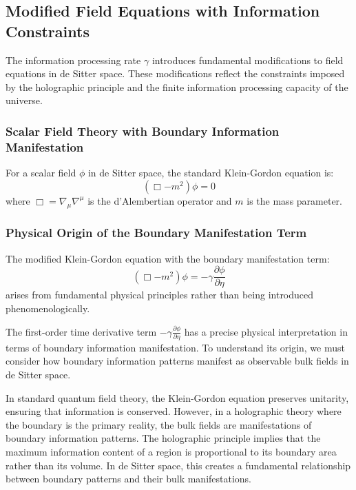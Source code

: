 \documentclass[11pt,english,twoside]{article}
\theoremstyle{plain}
\theoremstyle{definition}
\theoremstyle{remark}
\newcommand{\gammaR}{\gamma}
\begin{document}
\subsection{Modified Field Equations with Information Constraints}
\label{subsec:modified_equations}

The information processing rate $\gammaR$ introduces fundamental modifications to field equations in de Sitter space. These modifications reflect the constraints imposed by the holographic principle and the finite information processing capacity of the universe.

\subsubsection{Scalar Field Theory with Boundary Information Manifestation}

For a scalar field $\phi$ in de Sitter space, the standard Klein-Gordon equation is:
\begin{equation}
\label{eq:klein_gordon_standard}
(\Box - m^2)\phi = 0
\end{equation}
where $\Box = \nabla_{\mu} \nabla^\mu$ is the d'Alembertian operator and $m$ is the mass parameter.

\subsubsection{Physical Origin of the Boundary Manifestation Term}

The modified Klein-Gordon equation with the boundary manifestation term:
\begin{equation}
\label{eq:klein_gordon_modified}
(\Box - m^2)\phi = -\gammaR \frac{\partial\phi}{\partial\eta}
\end{equation}
arises from fundamental physical principles rather than being introduced phenomenologically.

The first-order time derivative term $-\gammaR \frac{\partial\phi}{\partial\eta}$ has a precise physical interpretation in terms of boundary information manifestation. To understand its origin, we must consider how boundary information patterns manifest as observable bulk fields in de Sitter space.

In standard quantum field theory, the Klein-Gordon equation preserves unitarity, ensuring that information is conserved. However, in a holographic theory where the boundary is the primary reality, the bulk fields are manifestations of boundary information patterns. The holographic principle implies that the maximum information content of a region is proportional to its boundary area rather than its volume. In de Sitter space, this creates a fundamental relationship between boundary patterns and their bulk manifestations.
\end{document}
